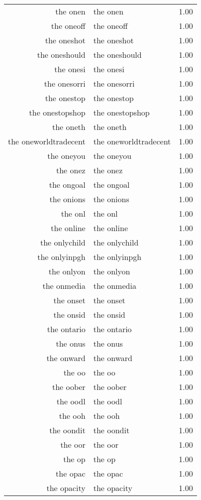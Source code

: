 \begin{table}[ht]
\begin{tabular}{rlr}
  the onen & the onen & 1.00 \\ 
  the oneoff & the oneoff & 1.00 \\ 
  the oneshot & the oneshot & 1.00 \\ 
  the oneshould & the oneshould & 1.00 \\ 
  the onesi & the onesi & 1.00 \\ 
  the onesorri & the onesorri & 1.00 \\ 
  the onestop & the onestop & 1.00 \\ 
  the onestopshop & the onestopshop & 1.00 \\ 
  the oneth & the oneth & 1.00 \\ 
  the oneworldtradecent & the oneworldtradecent & 1.00 \\ 
  the oneyou & the oneyou & 1.00 \\ 
  the onez & the onez & 1.00 \\ 
  the ongoal & the ongoal & 1.00 \\ 
  the onions & the onions & 1.00 \\ 
  the onl & the onl & 1.00 \\ 
  the online & the online & 1.00 \\ 
  the onlychild & the onlychild & 1.00 \\ 
  the onlyinpgh & the onlyinpgh & 1.00 \\ 
  the onlyon & the onlyon & 1.00 \\ 
  the onmedia & the onmedia & 1.00 \\ 
  the onset & the onset & 1.00 \\ 
  the onsid & the onsid & 1.00 \\ 
  the ontario & the ontario & 1.00 \\ 
  the onus & the onus & 1.00 \\ 
  the onward & the onward & 1.00 \\ 
  the oo & the oo & 1.00 \\ 
  the oober & the oober & 1.00 \\ 
  the oodl & the oodl & 1.00 \\ 
  the ooh & the ooh & 1.00 \\ 
  the oondit & the oondit & 1.00 \\ 
  the oor & the oor & 1.00 \\ 
  the op & the op & 1.00 \\ 
  the opac & the opac & 1.00 \\ 
  the opacity & the opacity & 1.00 \\ 

\end{tabular}
\end{table}
